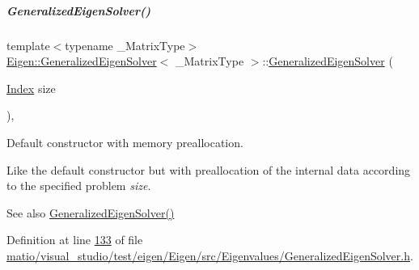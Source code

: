 \mbox{\label{group___eigenvalues___module_aab6423ded30275cd4cdd31758c278694}} 
\subparagraph{\texorpdfstring{Generalized\+Eigen\+Solver()}{GeneralizedEigenSolver()}\hspace{0.1cm}{\footnotesize\ttfamily [5/6]}}
{\footnotesize\ttfamily template$<$typename \+\_\+\+Matrix\+Type$>$ \\
\hyperlink{group___eigenvalues___module_class_eigen_1_1_generalized_eigen_solver}{Eigen\+::\+Generalized\+Eigen\+Solver}$<$ \+\_\+\+Matrix\+Type $>$\+::\hyperlink{group___eigenvalues___module_class_eigen_1_1_generalized_eigen_solver}{Generalized\+Eigen\+Solver} (\begin{DoxyParamCaption}\item[{\hyperlink{group___eigenvalues___module_a46a0ff3841059479ec314e56a5645302}{Index}}]{size }\end{DoxyParamCaption})\hspace{0.3cm}{\ttfamily [inline]}, {\ttfamily [explicit]}}



Default constructor with memory preallocation. 

Like the default constructor but with preallocation of the internal data according to the specified problem {\itshape size}. \begin{DoxySeeAlso}{See also}
\hyperlink{group___eigenvalues___module_ae745f39da43f9df192cc2875d82b4cf1}{Generalized\+Eigen\+Solver()} 
\end{DoxySeeAlso}


Definition at line \hyperlink{matio_2visual__studio_2test_2eigen_2_eigen_2src_2_eigenvalues_2_generalized_eigen_solver_8h_source_l00133}{133} of file \hyperlink{matio_2visual__studio_2test_2eigen_2_eigen_2src_2_eigenvalues_2_generalized_eigen_solver_8h_source}{matio/visual\+\_\+studio/test/eigen/\+Eigen/src/\+Eigenvalues/\+Generalized\+Eigen\+Solver.\+h}.

